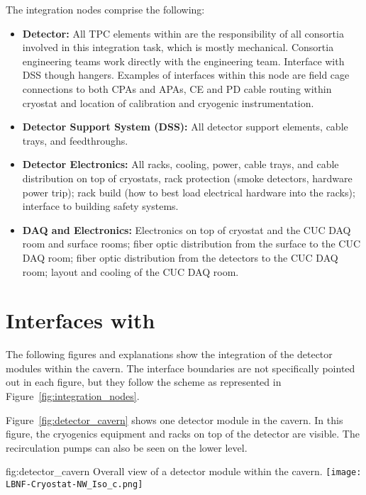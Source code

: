 The integration nodes comprise the following:
\begin{itemize}
\item {\bf Detector:} All TPC elements within  are the responsibility of all consortia involved in
  this integration task, which is mostly mechanical. Consortia
  engineering teams work directly with the  engineering team.
  Interface with DSS though hangers. Examples of interfaces within
  this node are field cage connections to both CPAs and APAs, CE and
  PD cable routing within cryostat and location of calibration and
  cryogenic instrumentation. 
\item {\bf Detector Support System (DSS):} All detector support elements,
  cable trays, and feedthroughs.
\item {\bf Detector Electronics:} All racks, cooling, power, cable
  trays, and cable distribution on top of cryostats, rack protection
  (smoke detectors, hardware power trip); rack build (how to best load electrical hardware into the racks); interface to
  building safety systems. 
\item {\bf DAQ and Electronics:} Electronics on top of cryostat and
  the CUC DAQ room and surface rooms; fiber optic distribution from
  the surface to the CUC DAQ room; fiber optic distribution from the
  detectors to the CUC DAQ room; layout and cooling of the CUC DAQ
  room.
\end{itemize}

\section{Interfaces with }
\label{sec:inter-lbnf-interf}
The following figures and explanations show the
integration of the detector modules within the cavern. The interface
boundaries are not specifically pointed out in each figure, but they
follow the scheme as represented in
Figure~\ref{fig:integration_nodes}.

Figure~\ref{fig:detector_cavern} shows one detector module in the
cavern. In this figure, the cryogenics equipment and racks on top of
the detector are visible. The  recirculation pumps can also be seen
on the lower level.
\begin{dunefigure}{fig:detector_cavern}
  {Overall view of a detector module within the cavern.}
  \texttt{[image: LBNF-Cryostat-NW\_Iso\_c.png]}
\end{dunefigure}

